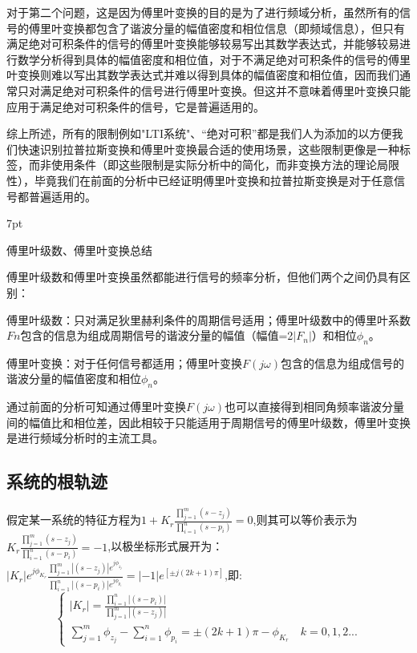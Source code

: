 \documentclass{article}
\numberwithin{equation}{section}
\numberwithin{figure}{section}
\newenvironment{formal}{%
\def\FrameCommand{%
\hspace{1pt}%
{\color{DarkBlue}\vrule width 2pt}%
{\color{formalshade}\vrule width 4pt}%
\colorbox{formalshade}%
}%
\MakeFramed{\advance\hsize-\width\FrameRestore}%
\noindent\hspace{-4.55pt}%
\begin{adjustwidth}{}{7pt}%
\vspace{2pt}\vspace{2pt}%
}
{%
\vspace{2pt}\end{adjustwidth}\endMakeFramed%
}
\begin{document}
    对于第二个问题，这是因为傅里叶变换的目的是为了进行频域分析，虽然所有的信号的傅里叶变换都包含了谐波分量的幅值密度和相位信息（即频域信息），但只有满足绝对可积条件的信号的傅里叶变换能够较易写出其数学表达式，并能够较易进行数学分析得到具体的幅值密度和相位值，对于不满足绝对可积条件的信号的傅里叶变换则难以写出其数学表达式并难以得到具体的幅值密度和相位值，因而我们通常只对满足绝对可积条件的信号进行傅里叶变换。但这并不意味着傅里叶变换只能应用于满足绝对可积条件的信号，它是普遍适用的。

    综上所述，所有的限制例如"LTI系统"、“绝对可积”都是我们人为添加的以方便我们快速识别拉普拉斯变换和傅里叶变换最合适的使用场景，这些限制更像是一种标签，而非使用条件（即这些限制是实际分析中的简化，而非变换方法的理论局限性），毕竟我们在前面的分析中已经证明傅里叶变换和拉普拉斯变换是对于任意信号都普遍适用的。

\begin{formal}
    傅里叶级数、傅里叶变换总结
\end{formal}

    傅里叶级数和傅里叶变换虽然都能进行信号的频率分析，但他们两个之间仍具有区别：

    傅里叶级数：只对满足狄里赫利条件的周期信号适用；傅里叶级数中的傅里叶系数$Fn$包含的信息为组成周期信号的谐波分量的幅值（幅值=2$|F_n|$）和相位$\phi_n$。

    傅里叶变换：对于任何信号都适用；傅里叶变换$F(j\omega)$包含的信息为组成信号的谐波分量的幅值密度和相位$\phi_n$。

    通过前面的分析可知通过傅里叶变换$F(j\omega)$也可以直接得到相同角频率谐波分量间的幅值比和相位差，因此相较于只能适用于周期信号的傅里叶级数，傅里叶变换是进行频域分析时的主流工具。

\subsection{系统的根轨迹}

假定某一系统的特征方程为$1+K_r\frac{\prod_{j=1}^{m}(s-z_j)}{\prod_{i=1}^{n}(s-p_i)}=0$,则其可以等价表示为$K_r\frac{\prod_{j=1}^{m}(s-z_j)}{\prod_{i=1}^{n}(s-p_i)}=-1$,以极坐标形式展开为：$|K_r|e^{j\phi_{K_r}}\frac{\prod_{j=1}^{m}|(s-z_j)|e^{j\phi_{z_j}}}{\prod_{i=1}^{n}|(s-p_i)|e^{j\phi_{p_i}}}=|-1|e^{[±j(2k+1)\pi]}$,即:
\begin{equation}
    \begin{cases}
       |K_r|=\frac{\prod_{i=1}^{n}|(s-p_i)|}{\prod_{j=1}^{m}|(s-z_j)|}\\
       \sum_{j=1}^{m}\phi_{z_j}-\sum_{i=1}^{n}\phi_{p_i}=±(2k+1)\pi - \phi_{K_r} \quad k=0,1,2...
    \end{cases}
\end{equation}
\end{document}
